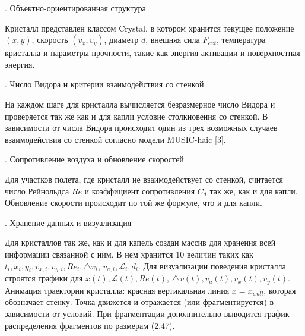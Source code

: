 . Объектно-ориентированная структура

Кристалл представлен классом Crystal, в котором хранится текущее положение $(x,y)$, скорость $(v_x,v_y)$, диаметр $d$, внешняя сила $F_{ext}$, температура кристалла и параметры прочности, такие как энергия активации и поверхностная энергия.

. Число Видора и критерии взаимодействия со стенкой

На каждом шаге для кристалла вычисляется безразмерное число Видора и проверяется так же как и для капли условие столкновения со стенкой. В зависимости от числа Видора происходит один из трех возможных случаев взаимодействия со стенкой согласно модели MUSIC-haic [3].

. Сопротивление воздуха и обновление скоростей

Для участков полета, где кристалл не взаимодействует со стенкой, считается число Рейнольдса $Re$ и коэффициент сопротивления $C_d$ так же, как и для капли. Обновление скорости происходит по той же формуле, что и для капли.

. Хранение данных и визуализация

Для кристаллов так же, как и для капель создан массив для хранения всей информации связанной с ним. В нем хранится 10 величин таких как $t_i,x_i,y_i,v_{x,i},v_{y,i},Re_i,\triangle v_i$, $v_{a,i},\mathcal{L}_i,d_i$. Для визуализации поведения кристалла строятся графики для $x(t),\mathcal{L}(t),Re(t)$, $\triangle v(t),v_a(t),v_x(t),v_y(t)$. Анимация траектории кристалла: красная вертикальная линия $x=x_{wall}$, которая обозначает стенку. Точка движется и отражается (или фрагментируется) в зависимости от условий. При фрагментации дополнительно выводится график распределения фрагментов по размерам (2.47). 